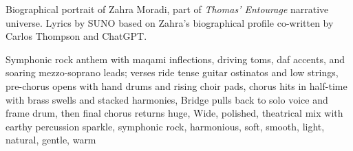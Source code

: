 
\begin{notes}
Biographical portrait of Zahra Moradi, part of \emph{Thomas’ Entourage} narrative universe. Lyrics by SUNO based on Zahra's biographical profile co-written by Carlos Thompson and ChatGPT.
\end{notes}
\begin{style}
Symphonic rock anthem with maqami inflections, driving toms, daf accents, and soaring mezzo-soprano leads; verses ride tense guitar ostinatos and low strings, pre-chorus opens with hand drums and rising choir pads, chorus hits in half-time with brass swells and stacked harmonies, Bridge pulls back to solo voice and frame drum, then final chorus returns huge, Wide, polished, theatrical mix with earthy percussion sparkle, symphonic rock, harmonious, soft, smooth, light, natural, gentle, warm
\end{style}
